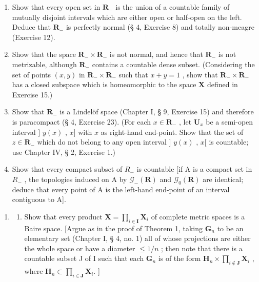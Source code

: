 \begin{enumerate}
\def\labelenumi{\alph{enumi})}
\item
  Show that every open set in \(\mathbf{R}_{-}\) is the union of a countable family of mutually disjoint intervals which are either open or half-open on the left. Deduce that \(\mathbf{R}_{-}\) is perfectly normal (§ 4, Exercise 8) and totally non-meagre (Exercise 12).
\item
  Show that the space \(\mathbf{R}_{-} \times \mathbf{R}_{-}\) is not normal, and hence that \(\mathbf{R}_{-}\) is not metrizable, although \(\mathbf{R}_{-}\) contains a countable dense subset. (Considering the set of points \((x, y)\) in \(\mathbf{R}_{-} \times \mathbf{R}_{-}\) such that \(x + y = 1\) , show that \(\mathbf{R}_{-} \times \mathbf{R}_{-}\) has a closed subspace which is homeomorphic to the space \(\mathbf{X}\) defined in Exercise 15.)
\item
  Show that \(\mathbf{R}_{-}\) is a Lindelöf space (Chapter I, § 9, Exercise 15) and therefore is paracompact (§ 4, Exercise 23). (For each \(x \in \mathbf{R}_{-}\) , let \(\mathbf{U}_x\) be a semi-open interval {]} \(y(x)\) , \(x]\) with \(x\) as right-hand end-point. Show that the set of \(z \in \mathbf{R}_{-}\) which do not belong to any open interval {]} \(y(x)\) , \(x[\) is countable; use Chapter IV, § 2, Exercise 1.)
\item
  Show that every compact subset of \(R_{-}\) is countable {[}if A is a compact set in \(R_{-}\) , the topologies induced on A by \(\mathcal{G}_{-}(\mathbf{R})\) and \(\mathcal{G}_{0}(\mathbf{R})\) are identical; deduce that every point of A is the left-hand end-point of an interval contiguous to A{]}.
\end{enumerate}

\begin{enumerate}
\def\labelenumi{\arabic{enumi})}
\setcounter{enumi}{16}
\tightlist
\item
  \begin{enumerate}
  \def\labelenumii{\alph{enumii})}
  \tightlist
  \item
    Show that every product \(\mathbf{X} = \prod_{i\in \mathbf{I}}\mathbf{X}_i\) of complete metric spaces is a Baire space. {[}Argue as in the proof of Theorem 1, taking \(\mathbf{G}_n\) to be an elementary set (Chapter I, § 4, no. 1) all of whose projections are either the whole space or have a diameter \(\leqslant 1 / n\) ; then note that there is a countable subset J of I such that each \(\mathbf{G}_n\) is of the form \(\mathbf{H}_n\times \prod_{i\notin \mathbf{J}}\mathbf{X}_i\) , where \(\mathbf{H}_n\subset \prod_{i\in \mathbf{J}}\mathbf{X}_i.\) {]}
  \end{enumerate}
\end{enumerate}

